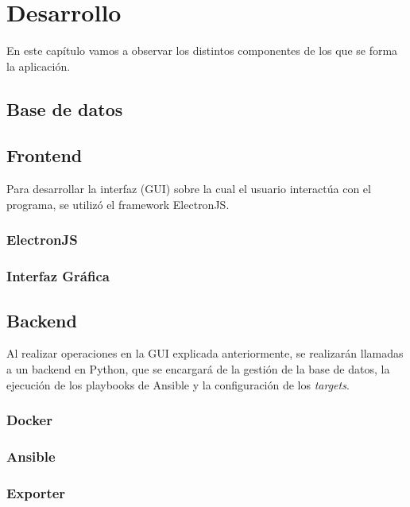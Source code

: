 \chapter{Desarrollo}
\label{ch:desarrollo}
En este capítulo vamos a observar los distintos componentes de los que se forma la aplicación. 
\section{Base de datos}
\label{sec:database}


\section{Frontend}
\label{sec:frontend}
Para desarrollar la interfaz (GUI) sobre la cual el usuario interactúa con el programa, se utilizó el framework ElectronJS\cite{ElectronJS}. 

\subsection{ElectronJS}
\label{sec:electron}


\subsection{Interfaz Gráfica}
\label{sec:gui}


\section{Backend}
\label{sec:backend}
Al realizar operaciones en la GUI explicada anteriormente, se realizarán llamadas a un backend en Python, que se encargará de la gestión de la base de datos, la ejecución de los playbooks de Ansible y la configuración de los	\textit{targets}.
\subsection{Docker}
\label{sec:docker}


\subsection{Ansible}
\label{sec:ansible}


\subsection{Exporter}
\label{sec:exporter}


